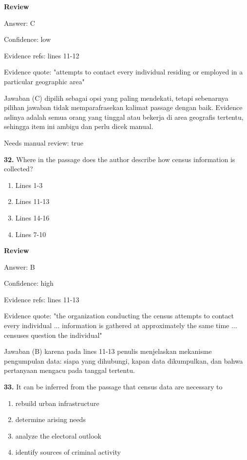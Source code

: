 \documentclass[12pt]{article}
\begin{document}
\par
\begingroup
\setlength{\parskip}{0pt}
\setlength{\parindent}{0pt}
\textbf{Review}\par
Answer: C\par
Confidence: low\par
Evidence refs: lines 11-12\par
Evidence quote: "attempts to contact every individual residing or employed in a particular geographic area"\par
Jawaban (C) dipilih sebagai opsi yang paling mendekati, tetapi sebenarnya pilihan jawaban tidak memparafrasekan kalimat passage dengan baik. Evidence aslinya adalah semua orang yang tinggal atau bekerja di area geografis tertentu, sehingga item ini ambigu dan perlu dicek manual.\par
Needs manual review: true\par
\endgroup
\par
\vspace{0.25\baselineskip}
\noindent\textbf{32.} Where in the passage does the author describe how census information is collected?
\begin{enumerate}[label=(\Alph*),leftmargin=*,itemsep=0.2em]
\item Lines 1-3
\item Lines 11-13
\item Lines 14-16
\item Lines 7-10
\end{enumerate}
\par
\begingroup
\setlength{\parskip}{0pt}
\setlength{\parindent}{0pt}
\textbf{Review}\par
Answer: B\par
Confidence: high\par
Evidence refs: lines 11-13\par
Evidence quote: "the organization conducting the census attempts to contact every individual ... information is gathered at approximately the same time ... censuses question the individual"\par
Jawaban (B) karena pada lines 11-13 penulis menjelaskan mekanisme pengumpulan data: siapa yang dihubungi, kapan data dikumpulkan, dan bahwa pertanyaan mengacu pada tanggal tertentu.\par
\endgroup
\par
\vspace{0.25\baselineskip}
\noindent\textbf{33.} It can be inferred from the passage that census data are necessary to
\begin{enumerate}[label=(\Alph*),leftmargin=*,itemsep=0.2em]
\item rebuild urban infrastructure
\item determine arising needs
\item analyze the electoral outlook
\item identify sources of criminal activity
\end{enumerate}
\end{document}
